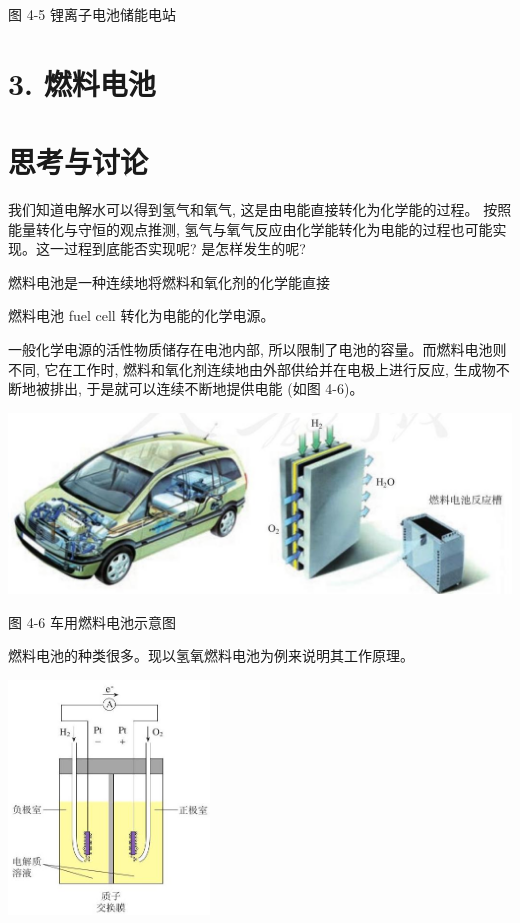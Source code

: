 \documentclass[10pt]{article}
\begin{document}
图 4-5 锂离子电池储能电站

\section*{3. 燃料电池}

\section*{思考与讨论}

我们知道电解水可以得到氢气和氧气, 这是由电能直接转化为化学能的过程。 按照能量转化与守恒的观点推测, 氢气与氧气反应由化学能转化为电能的过程也可能实现。这一过程到底能否实现呢? 是怎样发生的呢?

燃料电池是一种连续地将燃料和氧化剂的化学能直接

燃料电池 fuel cell 转化为电能的化学电源。

一般化学电源的活性物质储存在电池内部, 所以限制了电池的容量。而燃料电池则不同, 它在工作时, 燃料和氧化剂连续地由外部供给并在电极上进行反应, 生成物不断地被排出, 于是就可以连续不断地提供电能 (如图 4-6)。

\begin{center}
\includegraphics[max width=1.0\textwidth]{images/0190da9d-8bfd-732f-bc2c-0b21d0f13b91_105_106621.jpg}
\end{center}

图 4-6 车用燃料电池示意图

燃料电池的种类很多。现以氢氧燃料电池为例来说明其工作原理。

\begin{center}
\includegraphics[max width=0.4\textwidth]{images/0190da9d-8bfd-732f-bc2c-0b21d0f13b91_106_146174.jpg}
\end{center}
\end{document}

